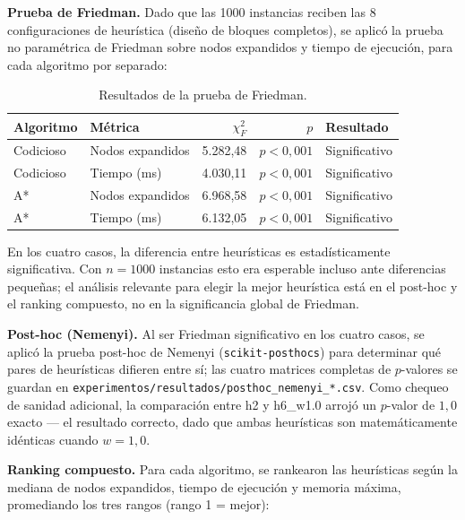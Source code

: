 \documentclass[11pt]{article}
\begin{document}
\textbf{Prueba de Friedman.} Dado que las 1000 instancias reciben las 8
configuraciones de heurística (diseño de bloques completos), se aplicó la
prueba no paramétrica de Friedman sobre nodos expandidos y tiempo de
ejecución, para cada algoritmo por separado:

\begin{table}[H]
\centering
\caption{Resultados de la prueba de Friedman.}
\begin{tabular}{llrrl}
\toprule
Algoritmo & Métrica & $\chi^2_F$ & $p$ & Resultado \\
\midrule
Codicioso & Nodos expandidos & 5.282,48 & $p<0{,}001$ & Significativo \\
Codicioso & Tiempo (ms) & 4.030,11 & $p<0{,}001$ & Significativo \\
A* & Nodos expandidos & 6.968,58 & $p<0{,}001$ & Significativo \\
A* & Tiempo (ms) & 6.132,05 & $p<0{,}001$ & Significativo \\
\bottomrule
\end{tabular}
\end{table}

\noindent
En los cuatro casos, la diferencia entre heurísticas es estadísticamente
significativa. Con $n=1000$ instancias esto era esperable incluso ante
diferencias pequeñas; el análisis relevante para elegir la mejor heurística
está en el post-hoc y el ranking compuesto, no en la significancia global de
Friedman.

\textbf{Post-hoc (Nemenyi).} Al ser Friedman significativo en los cuatro
casos, se aplicó la prueba post-hoc de Nemenyi (\texttt{scikit-posthocs})
para determinar qué pares de heurísticas difieren entre sí; las cuatro
matrices completas de $p$-valores se guardan en
\texttt{experimentos/resultados/posthoc\_nemenyi\_*.csv}. Como chequeo de
sanidad adicional, la comparación entre h2 y h6\_w1.0 arrojó un $p$-valor de
$1{,}0$ exacto --- el resultado correcto, dado que ambas heurísticas son
matemáticamente idénticas cuando $w=1{,}0$.

\textbf{Ranking compuesto.} Para cada algoritmo, se rankearon las
heurísticas según la mediana de nodos expandidos, tiempo de ejecución y
memoria máxima, promediando los tres rangos (rango 1 = mejor):
\end{document}
